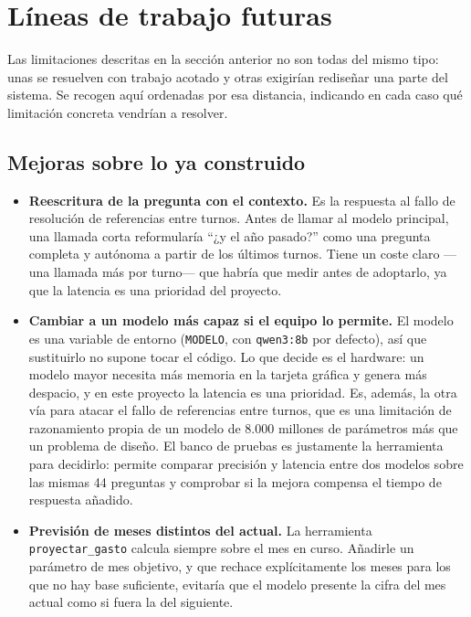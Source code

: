 \section{Líneas de trabajo futuras}

Las limitaciones descritas en la sección anterior no son todas del mismo tipo:
unas se resuelven con trabajo acotado y otras exigirían rediseñar una parte del
sistema. Se recogen aquí ordenadas por esa distancia, indicando en cada caso qué
limitación concreta vendrían a resolver.

\subsection{Mejoras sobre lo ya construido}

\begin{itemize}

    \item \textbf{Reescritura de la pregunta con el contexto.} Es la respuesta
    al fallo de resolución de referencias entre turnos. Antes de llamar al
    modelo principal, una llamada corta reformularía ``¿y el año pasado?'' como
    una pregunta completa y autónoma a partir de los últimos turnos. Tiene un
    coste claro —una llamada más por turno— que habría que medir antes de
    adoptarlo, ya que la latencia es una prioridad del proyecto.

    \item \textbf{Cambiar a un modelo más capaz si el equipo lo permite.} El
    modelo es una variable de entorno (\texttt{MODELO}, con \texttt{qwen3:8b}
    por defecto), así que sustituirlo no supone tocar el código. Lo que decide
    es el hardware: un modelo mayor necesita más memoria en la tarjeta gráfica y
    genera más despacio, y en este proyecto la latencia es una prioridad. Es,
    además, la otra vía para atacar el fallo de referencias entre turnos, que es
    una limitación de razonamiento propia de un modelo de 8.000 millones de
    parámetros más que un problema de diseño. El banco de pruebas es justamente
    la herramienta para decidirlo: permite comparar precisión y latencia entre
    dos modelos sobre las mismas 44 preguntas y comprobar si la mejora compensa
    el tiempo de respuesta añadido.

    \item \textbf{Previsión de meses distintos del actual.} La herramienta
    \texttt{proyectar\_gasto} calcula siempre sobre el mes en curso. Añadirle un
    parámetro de mes objetivo, y que rechace explícitamente los meses para los
    que no hay base suficiente, evitaría que el modelo presente la cifra del mes
    actual como si fuera la del siguiente.


\end{itemize}
